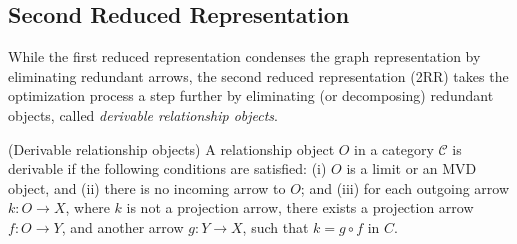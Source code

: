 
\subsection{Second Reduced Representation}



While the first reduced representation condenses the graph representation by eliminating redundant arrows,  the second reduced representation (2RR) takes the optimization process a step further by eliminating (or decomposing) redundant objects, called \textit{derivable relationship objects}.


\begin{definition} (Derivable relationship objects) A  relationship object $O$ in a category $\mathcal{C}$ is derivable if the following conditions are satisfied: (i) $O$ is a limit or an MVD object, and (ii) there is no incoming arrow to $O$; and (iii) for each outgoing arrow $k: O \to X$, where $k$ is not a projection arrow, there exists a projection arrow $f: O \to Y$, and another arrow $g: Y \to X$, such that $k = g \circ f$ in $C$. \label{def:derivable_relation}\end{definition}


